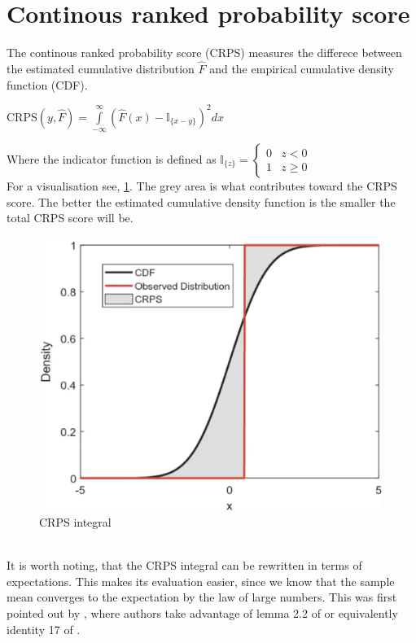 \section{Continous ranked probability score}
The continous ranked probability score (CRPS) measures the differece between the estimated cumulative distribution $\hat{F}$ and the empirical cumulative density function (CDF).
\begin{definition}\label{def_crps}
    $\mathrm{CRPS}(y, \hat{F})=\int\limits_{-\infty}^{\infty}\left(\hat{F}(x)-\mathbb{I}_{\{x-y\}} \right)^2 dx$
\end{definition}
Where the indicator function is defined as 
    $\mathbb{I}_{\{z\}}=
\begin{cases}
0 & z<0\\
1 & z \geq 0
\end{cases}$
\\
For a visualisation see, \ref{fig:crps}. The grey area is what contributes toward the CRPS score.
The better the estimated cumulative density function is the smaller the total CRPS score will be.
\begin{figure}
    \includegraphics[width=\textwidth]{images/crps.png}
    \caption{CRPS integral \cite{haben2023core}}
    \label{fig:crps}
  \end{figure}
  \\
It is worth noting, that the CRPS integral can be rewritten in terms of expectations. This makes its evaluation easier, since we know that the sample mean converges to the expectation by the law of large numbers. This was first pointed out by \cite{proper_scores}, where authors take advantage of lemma 2.2 of \cite{new_multi_test2} or equivalently identity 17 of \cite{new_multi_tes1}.
